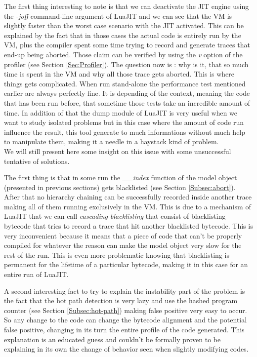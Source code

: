 
The first thing interesting to note is that we can deactivate the JIT engine using
the \emph{-joff} command-line argument of LuaJIT and we can see that the VM is
slightly faster than the worst case scenario with the JIT activated. This can
be explained by the fact that in those cases the actual code is entirely run by
the VM, plus the compiler spent some time trying to record and generate traces
that end-up being aborted. Those claim can be verified by using the \emph{v}
option of the profiler (see Section \ref{Sec:Profiler}). The question now is :
why is it, that so much time is spent in the VM and why all those trace gets
aborted. This is where things gets complicated. When run stand-alone the
performance test mentioned earlier are always perfectly fine. It is depending of
the context, meaning the code that has been run before, that sometime those
tests take an incredible amount of time. In addition of that the dump module of
LuaJIT is very useful when we want to study isolated problems but in this case
where the amount of code run influence the result, this tool generate to much
informations without much help to manipulate them, making it a needle in a
haystack kind of problem.\\

We will still present here some insight on this issue with some unsuccessful
tentative of solutions.

The first thing is that in some run the \emph{\_\_index}
function of the model object (presented in previous sections) gets blacklisted
(see Section \ref{Subsec:abort}). After that no hierarchy chaining can be
successfully recorded inside another trace making all of them running
exclusively in the VM. This is due to a mechanism of LuaJIT that we can call
\emph{cascading blacklisting} that consist of blacklisting bytecode that tries to
record a trace that hit another blacklisted bytecode. This is very inconvenient
because it means that a piece of code that can't be properly compiled for
whatever the reason can make the model object very slow for the rest of the run.
This is even more problematic knowing that blacklisting is permanent for the
lifetime of a particular bytecode, making it in this case for an entire run of
LuaJIT.

A second interesting fact to try to explain the instability part of the problem
is the fact that the hot path detection is very lazy and use the hashed program
counter (see Section \ref{Subsec:hot-path}) making false positive very easy to
occur. So any change to the code can change the bytecode alignment and the
potential false positive, changing in its turn the entire profile of the code
generated. This explanation is an educated guess and couldn't be formally proven
to be explaining in its own the change of behavior seen when slightly modifying
codes.

